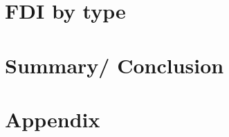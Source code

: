 \documentclass[a4paper,11pt]{scrartcl}
\newcommand{\sectionnumbering}[1]{%
  \setcounter{section}{0}%
   \renewcommand{\thesection}{\csname #1\endcsname{section}}}
\begin{document}
\newpage
\section{FDI by type}

\section{Summary/ Conclusion}




\newpage






\section*{Appendix}
\sectionnumbering{Roman}
\setcounter{page}{3} %
\end{document}
